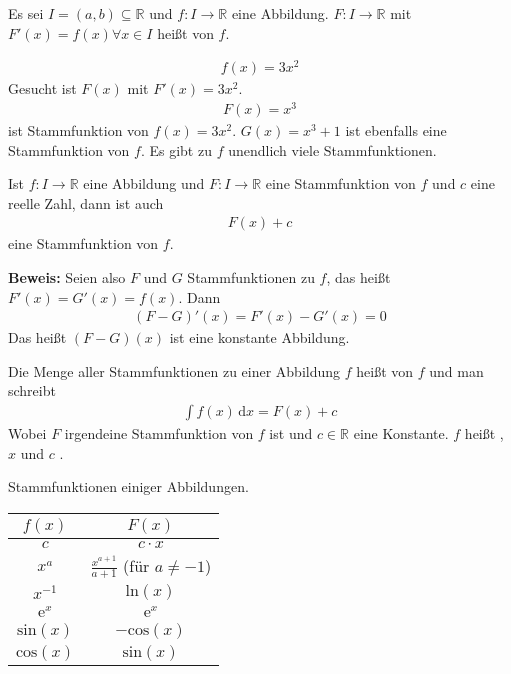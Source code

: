 

Es sei $I = (a, b) \subseteq \mathbb{R}$ und $f : I \rightarrow \mathbb{R}$ eine Abbildung. $F : I \rightarrow \mathbb{R}$ mit $F'(x) = f(x) \forall x \in I$ heißt  von  $f$.

\begin{align*}
	f(x) = 3x^2
\end{align*}
Gesucht ist $F(x)$ mit $F'(x) = 3x^2$.
\begin{align*}
	F(x) = x^3
\end{align*}
ist Stammfunktion von $f(x) = 3x^2$. $G(x) = x^3 + 1$ ist ebenfalls eine Stammfunktion von $f$. Es gibt zu $f$ unendlich viele Stammfunktionen.

Ist $f : I \rightarrow \mathbb{R}$ eine Abbildung und $F : I \rightarrow \mathbb{R}$ eine Stammfunktion von $f$ und $c$ eine reelle Zahl, dann ist auch
\begin{align*}
	F(x) + c
\end{align*}
eine Stammfunktion von $f$.

\bigskip
\textbf{Beweis:} Seien also $F$ und $G$ Stammfunktionen zu $f$, das heißt $F'(x) = G'(x) = f(x)$. Dann
\begin{align*}
	(F-G)'(x) = F'(x)-G'(x) = 0
\end{align*}
Das heißt $(F-G)(x)$ ist eine konstante Abbildung.

Die Menge aller Stammfunktionen zu einer Abbildung $f$ heißt  von $f$ und man schreibt
\begin{align*}
	\int \! f(x) \, \mathrm{d}x = F(x) + c
\end{align*}
Wobei $F$ irgendeine Stammfunktion von $f$ ist und $c \in \mathbb{R}$ eine Konstante. $f$ heißt , $x$  und $c$ .

Stammfunktionen einiger Abbildungen.
\begin{center}
	\begin{tabular}{c|c}
		$f(x)$ & $F(x)$ \\ \hline
		$c$ & $c\cdot x$ \\
		$x^a$ & $\frac{x^{a+1}}{a+1}$ (für $a \neq -1$) \\
		$x^{-1}$ & $\text{ln}(x)$ \\
		$\mathrm{e}^x$ & $\mathrm{e}^x$ \\
		$\text{sin}(x)$ & $-\text{cos}(x)$ \\
		$\text{cos}(x)$ & $\text{sin}(x)$
	\end{tabular}
\end{center}

